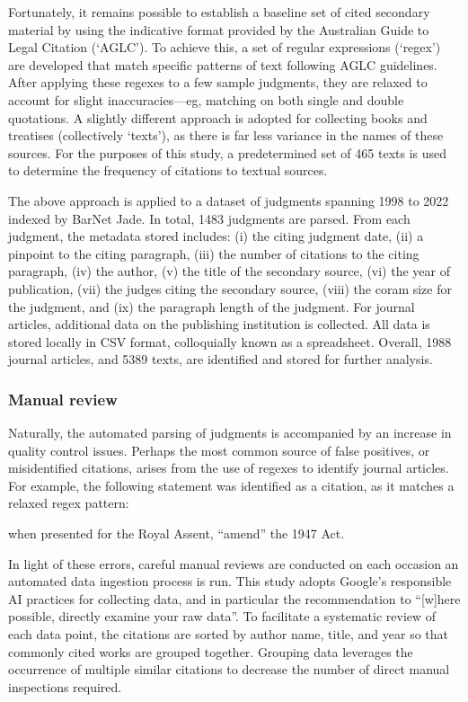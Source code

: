 Fortunately, it remains possible to establish a baseline set of cited secondary material by using the indicative format provided by the Australian Guide to Legal Citation (`AGLC'). To achieve this, a set of regular expressions (`regex') are developed that match specific patterns of text following AGLC guidelines. After applying these regexes to a few sample judgments, they are relaxed to account for slight inaccuracies---eg, matching on both single and double quotations. A slightly different approach is adopted for collecting books and treatises (collectively `texts'), as there is far less variance in the names of these sources. For the purposes of this study, a predetermined set of 465 texts is used to determine the frequency of citations to textual sources.

The above approach is applied to a dataset of judgments spanning 1998 to 2022 indexed by BarNet Jade. In total, 1483 judgments are parsed. From each judgment, the metadata stored includes: (i) the citing judgment date, (ii) a pinpoint to the citing paragraph, (iii) the number of citations to the citing paragraph, (iv) the author, (v) the title of the secondary source, (vi) the year of publication, (vii) the judges citing the secondary source, (viii) the coram size for the judgment, and (ix) the paragraph length of the judgment. For journal articles, additional data on the publishing institution is collected. All data is stored locally in CSV format, colloquially known as a spreadsheet. Overall, 1988 journal articles, and 5389 texts, are identified and stored for further analysis.

\subsubsection{Manual review}

Naturally, the automated parsing of judgments is accompanied by an increase in quality control issues. Perhaps the most common source of false positives, or misidentified citations, arises from the use of regexes to identify journal articles. For example, the following statement was identified as a citation, as it matches a relaxed regex pattern:

\begin{center}
when presented for the Royal Assent, ``amend'' the 1947 Act.
\end{center}

In light of these errors, careful manual reviews are conducted on each occasion an automated data ingestion process is run. This study adopts Google's responsible AI practices for collecting data, and in particular the recommendation to ``[w]here possible, directly examine your raw data''. To facilitate a systematic review of each data point, the citations are sorted by author name, title, and year so that commonly cited works are grouped together. Grouping data leverages the occurrence of multiple similar citations to decrease the number of direct manual inspections required.

